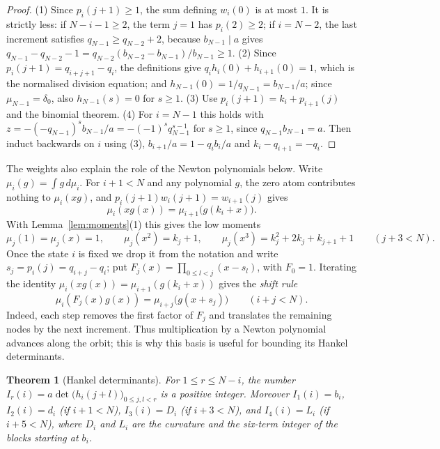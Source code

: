 \documentclass[11pt]{article}
\newtheorem{theorem}{Theorem}[section]
\theoremstyle{definition}
\theoremstyle{remark}
\begin{document}
\begin{proof}
(1) Since $p_i(j+1)\ge1$, the sum defining $w_i(0)$ is at most $1$. It is strictly less: if
$N-i-1\ge2$, the term $j=1$ has $p_i(2)\ge2$; if $i=N-2$, the last increment satisfies
$q_{N-1}\ge q_{N-2}+2$, because $b_{N-1}\mid a$ gives
$q_{N-1}-q_{N-2}-1=q_{N-2}(b_{N-2}-b_{N-1})/b_{N-1}\ge1$. (2) Since $p_i(j+1)=q_{i+j+1}-q_i$, the definitions give
$q_ih_i(0)+h_{i+1}(0)=1$, which is the normalised division equation; and
$h_{N-1}(0)=1/q_{N-1}=b_{N-1}/a$; since $\mu_{N-1}=\delta_0$, also $h_{N-1}(s)=0$ for $s\ge1$.
(3) Use $p_i(j+1)=k_i+p_{i+1}(j)$ and the binomial theorem.
(4) For $i=N-1$ this holds with $z=-(-q_{N-1})^sb_{N-1}/a=-(-1)^sq_{N-1}^{s-1}$ for $s\ge1$, since
$q_{N-1}b_{N-1}=a$. Then induct backwards on $i$ using (3), $b_{i+1}/a=1-q_ib_i/a$ and
$k_i-q_{i+1}=-q_i$.
\end{proof}

The weights also explain the role of the Newton polynomials below. Write
$\mu_i(g)=\int g\,d\mu_i$. For $i+1<N$ and any polynomial $g$, the zero
atom contributes nothing to $\mu_i(xg)$, and
$p_i(j+1)w_i(j+1)=w_{i+1}(j)$ gives
\[
 \mu_i(xg(x))=\mu_{i+1}\bigl(g(k_i+x)\bigr).
\]
With Lemma~\ref{lem:moments}(1) this gives the low moments
\begin{equation}\label{eq:lowmoments}
 \mu_j(1)=\mu_j(x)=1,\qquad \mu_j(x^2)=k_j+1,\qquad
 \mu_j(x^3)=k_j^2+2k_j+k_{j+1}+1\qquad(j+3<N).
\end{equation}
Once the state $i$ is fixed we drop it from the notation and write
$s_j=p_i(j)=q_{i+j}-q_i$; put $F_j(x)=\prod_{0\le l<j}(x-s_l)$, with
$F_0=1$. Iterating the identity $\mu_i(xg(x))=\mu_{i+1}(g(k_i+x))$ gives the \emph{shift rule}
\begin{equation}\label{eq:moment-shift}
 \mu_i(F_j(x)g(x))=\mu_{i+j}\bigl(g(x+s_j)\bigr)
 \qquad(i+j<N).
\end{equation}
Indeed, each step removes the first factor of $F_j$ and translates the
remaining nodes by the next increment. Thus multiplication by a Newton
polynomial advances along the orbit; this is why this basis is useful for
bounding its Hankel determinants.

\begin{theorem}[Hankel determinants]\label{thm:hankel}
For $1\le r\le N-i$, the number $I_r(i)=a\det\bigl(h_i(j+l)\bigr)_{0\le j,l<r}$ is a positive
integer. Moreover $I_1(i)=b_i$, $I_2(i)=d_i$ (if $i+1<N$), $I_3(i)=D_i$ (if $i+3<N$), and
$I_4(i)=L_i$ (if $i+5<N$), where $D_i$ and $L_i$ are the curvature and the six-term integer
of the blocks starting at $b_i$.
\end{theorem}
\end{document}
